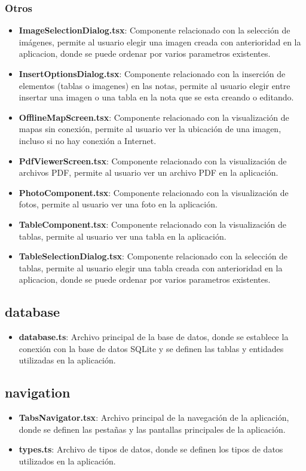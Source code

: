 \documentclass[a4paper,12pt]{article}
\begin{document}
\subsubsection{Otros}
\begin{itemize}
    \item \textbf{ImageSelectionDialog.tsx}: Componente relacionado con la selección de imágenes, permite al usuario elegir una imagen creada con anterioridad en la aplicacion, donde se puede ordenar por varios parametros existentes.
    \item \textbf{InsertOptionsDialog.tsx}: Componente relacionado con la inserción de elementos (tablas o imagenes) en las notas, permite al usuario elegir entre insertar una imagen o una tabla en la nota que se esta creando o editando.
    \item \textbf{OfflineMapScreen.tsx}: Componente relacionado con la visualización de mapas sin conexión, permite al usuario ver la ubicación de una imagen, incluso si no hay conexión a Internet.
    \item \textbf{PdfViewerScreen.tsx}: Componente relacionado con la visualización de archivos PDF, permite al usuario ver un archivo PDF en la aplicación.
    \item \textbf{PhotoComponent.tsx}: Componente relacionado con la visualización de fotos, permite al usuario ver una foto en la aplicación.
    \item \textbf{TableComponent.tsx}: Componente relacionado con la visualización de tablas, permite al usuario ver una tabla en la aplicación.
    \item \textbf{TableSelectionDialog.tsx}: Componente relacionado con la selección de tablas, permite al usuario elegir una tabla creada con anterioridad en la aplicacion, donde se puede ordenar por varios parametros existentes.
\end{itemize}


\subsection{database}

\begin{itemize}
    \item \textbf{database.ts}: Archivo principal de la base de datos, donde se establece la conexión con la base de datos SQLite y se definen las tablas y entidades utilizadas en la aplicación.
\end{itemize}

\subsection{navigation}

\begin{itemize}
    \item \textbf{TabsNavigator.tsx}: Archivo principal de la navegación de la aplicación, donde se definen las pestañas y las pantallas principales de la aplicación.
    \item \textbf{types.ts}: Archivo de tipos de datos, donde se definen los tipos de datos utilizados en la aplicación.
\end{itemize}
\end{document}
